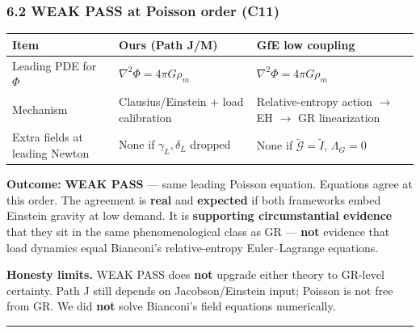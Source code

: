 \documentclass[
  11pt,
]{article}
\newcounter{none} %
\begin{document}
\subsubsection{\texorpdfstring{6.2 WEAK PASS at Poisson order
(\textbf{C11})}{6.2 WEAK PASS at Poisson order (C11)}}\label{weak-pass-at-poisson-order-c11}

{\def\LTcaptype{none} %
\begin{longtable}[]{@{}
  >{\raggedright\arraybackslash}p{}
  >{\raggedright\arraybackslash}p{}
  >{\raggedright\arraybackslash}p{}@{}}
\toprule\noalign{}
\begin{minipage}[b]{\linewidth}\raggedright
Item
\end{minipage} & \begin{minipage}[b]{\linewidth}\raggedright
Ours (Path J/M)
\end{minipage} & \begin{minipage}[b]{\linewidth}\raggedright
GfE low coupling
\end{minipage} \\
\midrule\noalign{}
\endhead
\bottomrule\noalign{}
\endlastfoot
Leading PDE for \(\Phi\) & \(\nabla^2\Phi=4\pi G\rho_m\) &
\(\nabla^2\Phi=4\pi G\rho_m\) \\
Mechanism & Clausius/Einstein + load calibration & Relative-entropy
action $\to$ EH $\to$ GR linearization \\
Extra fields at leading Newton & None if \(\gamma_L,\delta_L\) dropped &
None if \(\tilde{\mathcal{G}}=\tilde I\), \(\Lambda_G=0\) \\
\end{longtable}
}

\textbf{Outcome:} \textbf{WEAK PASS} --- same leading Poisson equation.
Equations agree at this order. The agreement is \textbf{real} and
\textbf{expected} if both frameworks embed Einstein gravity at low
demand. It is \textbf{supporting circumstantial evidence} that they sit
in the same phenomenological class as GR --- \textbf{not} evidence that
load dynamics equal Bianconi's relative-entropy Euler--Lagrange
equations.

\textbf{Honesty limits.} WEAK PASS does \textbf{not} upgrade either
theory to GR-level certainty. Path J still depends on Jacobson/Einstein
input; Poisson is not free from GR. We did \textbf{not} solve Bianconi's
field equations numerically.

\begin{center}\rule{0.5\linewidth}{0.5pt}\end{center}
\end{document}
